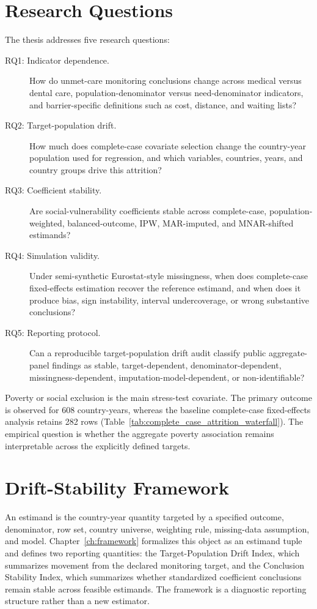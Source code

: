 \section{Research Questions}

The thesis addresses five research questions:

\begin{description}
    \item[RQ1: Indicator dependence.] How do unmet-care monitoring conclusions change across medical versus dental care, population-denominator versus need-denominator indicators, and barrier-specific definitions such as cost, distance, and waiting lists?
    \item[RQ2: Target-population drift.] How much does complete-case covariate selection change the country-year population used for regression, and which variables, countries, years, and country groups drive this attrition?
    \item[RQ3: Coefficient stability.] Are social-vulnerability coefficients stable across complete-case, population-weighted, balanced-outcome, IPW, MAR-imputed, and MNAR-shifted estimands?
    \item[RQ4: Simulation validity.] Under semi-synthetic Eurostat-style missingness, when does complete-case fixed-effects estimation recover the reference estimand, and when does it produce bias, sign instability, interval undercoverage, or wrong substantive conclusions?
    \item[RQ5: Reporting protocol.] Can a reproducible target-population drift audit classify public aggregate-panel findings as stable, target-dependent, denominator-dependent, missingness-dependent, imputation-model-dependent, or non-identifiable?
\end{description}

Poverty or social exclusion is the main stress-test covariate. The primary outcome is observed for 608 country-years, whereas the baseline complete-case fixed-effects analysis retains 282 rows (Table~\ref{tab:complete_case_attrition_waterfall}). The empirical question is whether the aggregate poverty association remains interpretable across the explicitly defined targets.

\section{Drift-Stability Framework}

An estimand is the country-year quantity targeted by a specified outcome, denominator, row set, country universe, weighting rule, missing-data assumption, and model. Chapter~\ref{ch:framework} formalizes this object as an estimand tuple and defines two reporting quantities: the Target-Population Drift Index, which summarizes movement from the declared monitoring target, and the Conclusion Stability Index, which summarizes whether standardized coefficient conclusions remain stable across feasible estimands. The framework is a diagnostic reporting structure rather than a new estimator.


